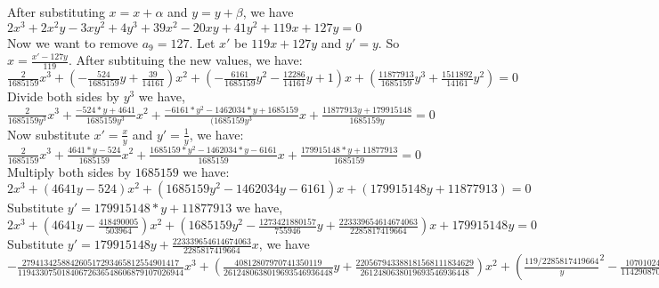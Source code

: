 After substituting $x = x + \alpha$ and $y = y + \beta$, we have\\
\noindent
$2x^3 + 2x^2y - 3xy^2 + 4y^3 + 39x^2 - 20xy + 41y^2 + 119x + 127y = 0$
\\

Now we want to remove $a_9 = 127$. Let $x'$ be $119x + 127y$ and $y' = y$. So
$x = \frac{x'-127y}{119}$. After subtituing the new values, we have:\\

\noindent
$\frac{2}{1685159}x^3 + (-\frac{524}{1685159}y + \frac{39}{14161})x^2 + (-\frac{6161}{1685159}y^2
- \frac{12286}{14161}y + 1)x + (\frac{11877913}{1685159}y^3 + \frac{1511892}{14161}y^2) = 0 $
\\

Divide  both sides by $y^3$ we have,\\

\noindent
$\frac{2}{1685159y^3}x^3 + \frac{-524*y + 4641}{1685159y^3}x^2 + \frac{-6161*y^2 - 1462034*y + 1685159}{(1685159y^3}x 
+ \frac{11877913y + 179915148}{1685159y}=0$
\\

Now substitute $x' = \frac{x}{y}$ and $y' = \frac{1}{y}$, we have:\\

\noindent
$\frac{2}{1685159}x^3 + \frac{4641*y - 524}{1685159}x^2 + \frac{1685159*y^2 - 1462034*y - 6161}{1685159}x + \frac{179915148*y + 11877913}{1685159} = 0$
\\

Multiply both sides by $1685159$ we have:\\
\noindent
$2x^3 + (4641y - 524)x^2 + (1685159y^2 - 1462034y - 6161)x + (179915148y + 11877913) = 0$
\\

Substitute $y' = 179915148*y + 11877913$ we have,\\

\noindent
$2x^3 + (4641y - \frac{418490005}{503964})x^2 + 
(1685159y^2 - \frac{1273421880157}{755946}y + 
\frac{223339654614674063}{2285817419664})x + 179915148y = 0$
\\

Substitute $y' = 179915148y + \frac{223339654614674063}{2285817419664}x$, we have\\

\noindent
$-\frac{279413425884260517293465812554901417}{11943307501840672636548606879107026944}x^3 + 
(\frac{40812807970741350119}{2612480638019693546936448}y + \frac{220567943388181568111834629}{2612480638019693546936448})x^2 + 
(\frac{119/2285817419664}y^2 - \frac{10701024203}{1142908709832}y)x + y = 0$
\\

